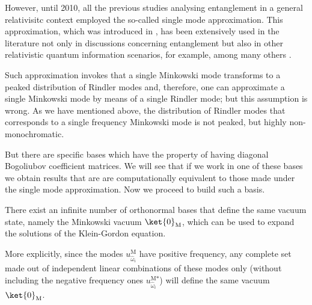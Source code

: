 However, until 2010, all the previous studies analysing entanglement in a general relativisitc context employed the so-called single mode approximation.  This approximation, which was introduced in \cite{Alsingtelep,AlsingMcmhMil}, has been extensively used in the literature not only in discussions concerning entanglement but also in other relativistic quantum information scenarios, for example, among many others \cite{Alicefalls,AlsingSchul,Bradler,highdim,chapucilla,chapucilla2,Shapoor,matsako,Ditta,Geneferm,DiracDiscord}. 

Such approximation invokes that a single Minkowski mode transforms to a peaked distribution of Rindler modes and, therefore, one can approximate a single  Minkowski mode by means of a single Rindler mode; but this assumption is wrong. As we have mentioned above, the distribution of Rindler modes that corresponds to a single frequency Minkowski mode is not peaked, but highly non-monochromatic.

But there are specific bases which have the property of having diagonal Bogoliubov coefficient matrices. We will see that if we work in one of these bases we obtain results that are are computationally equivalent to those made under the single mode approximation. Now we proceed to build such a basis.

There exist an infinite number of orthonormal bases
that define the same vacuum state, namely the Minkowski vacuum
$\ket{0}_\text{M}$, which can be used to expand the solutions of the
Klein-Gordon equation.

 More explicitly, since the modes
$u^\text{M}_{\hat\omega_i}$ have positive frequency, any complete set
made out of independent linear combinations of these modes only
(without including the negative frequency ones
$u^{\text{M}*}_{\hat\omega_i}$) will define the same vacuum
$\ket{0}_\text{M}$.

